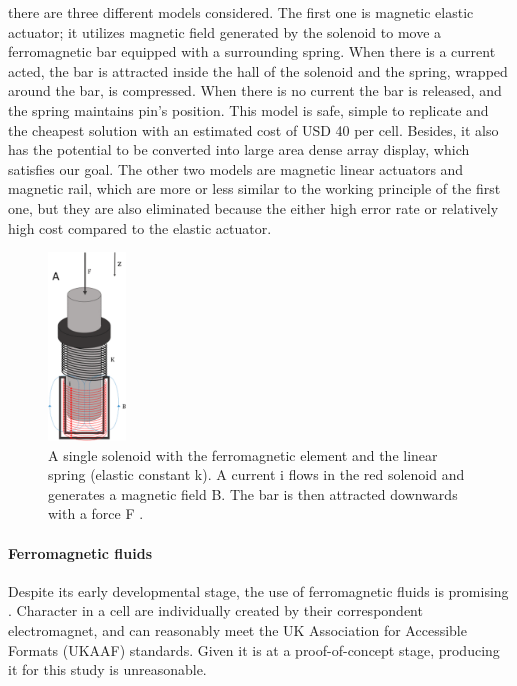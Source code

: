 there are three different models considered. The first one is magnetic elastic actuator; it utilizes magnetic field generated by the solenoid to move a ferromagnetic bar equipped with a surrounding spring. When there is a current acted, the bar is attracted inside the hall of the solenoid and the spring, wrapped around the bar, is compressed.
When there is no current the bar is released, and the spring maintains pin's position. This model is safe, simple to replicate and the cheapest solution with an estimated cost of USD 40 per cell.
Besides, it also has the potential to be converted into large area dense array display, which satisfies our goal. The other two models are magnetic linear actuators and magnetic rail, which are more or less similar to the working principle of the first one, but they are also eliminated because the either high error rate or relatively high cost compared to the elastic actuator.

\begin{figure} \centering
    \includegraphics[height=5cm]{figures/magnetic-spring.png}
\caption{A single solenoid with the ferromagnetic element and the linear spring (elastic constant k). A current i flows in the red solenoid and generates a magnetic field B. The bar is then attracted downwards with a force F .}
\label{fig:magnetic-spring.png}
\end{figure}

\paragraph{Ferromagnetic fluids}
Despite its early developmental stage, the use of ferromagnetic fluids is promising \cite{fletcher_magnetic_2021}.
Character in a cell are individually created by their correspondent electromagnet, and can reasonably meet the UK Association for Accessible Formats (UKAAF) standards.
Given it is at a proof-of-concept stage, producing it for this study is unreasonable.